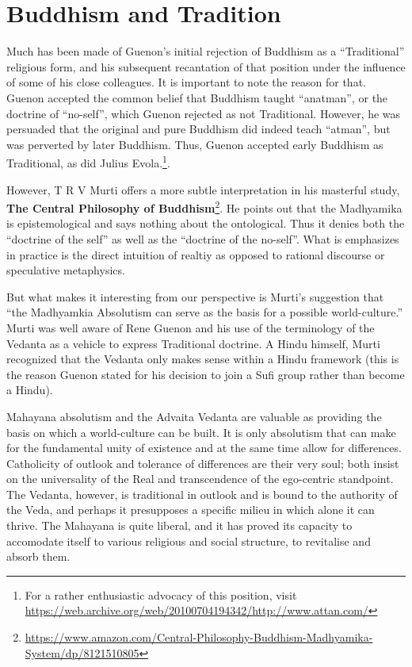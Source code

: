 \section{Buddhism and Tradition}

Much has been made of Guenon's initial rejection of Buddhism as a ``Traditional'' religious form, and his subsequent recantation of that position under the influence of some of his close colleagues. It is important to note the reason for that. Guenon accepted the common belief that Buddhism taught ``anatman'', or the doctrine of ``no-self'', which Guenon rejected as not Traditional. However, he was persuaded that the original and pure Buddhism did indeed teach ``atman'', but was perverted by later Buddhism. Thus, Guenon accepted early Buddhism as Traditional, as did Julius Evola.\footnote{For a rather enthusiastic advocacy of this position, visit \url{https://web.archive.org/web/20100704194342/http://www.attan.com/}}.

However, T R V Murti offers a more subtle interpretation in his masterful study, \textbf{The Central Philosophy of Buddhism}\footnote{\url{https://www.amazon.com/Central-Philosophy-Buddhism-Madhyamika-System/dp/8121510805}}. He points out that the Madhyamika is epistemological and says nothing about the ontological. Thus it denies both the ``doctrine of the self'' as well as the ``doctrine of the no-self''. What is emphasizes in practice is the direct intuition of realtiy as opposed to rational discourse or speculative metaphysics.

But what makes it interesting from our perspective is Murti's suggestion that ``the Madhyamkia Absolutism can serve as the basis for a possible world-culture.'' Murti was well aware of Rene Guenon and his use of the terminology of the Vedanta as a vehicle to express Traditional doctrine. A Hindu himself, Murti recognized that the Vedanta only makes sense within a Hindu framework (this is the reason Guenon stated for his decision to join a Sufi group rather than become a Hindu).

\begin{quotex}
Mahayana absolutism and the Advaita Vedanta are valuable as providing the basis on which a world-culture can be built. It is only absolutism that can make for the fundamental unity of existence and at the same time allow for differences. Catholicity of outlook and tolerance of differences are their very soul; both insist on the universality of the Real and transcendence of the ego-centric standpoint. The Vedanta, however, is traditional in outlook and is bound to the authority of the Veda, and perhaps it presupposes a specific milieu in which alone it can thrive. The Mahayana is quite liberal, and it has proved its capacity to accomodate itself to various religious and social structure, to revitalise and absorb them.
\end{quotex}


